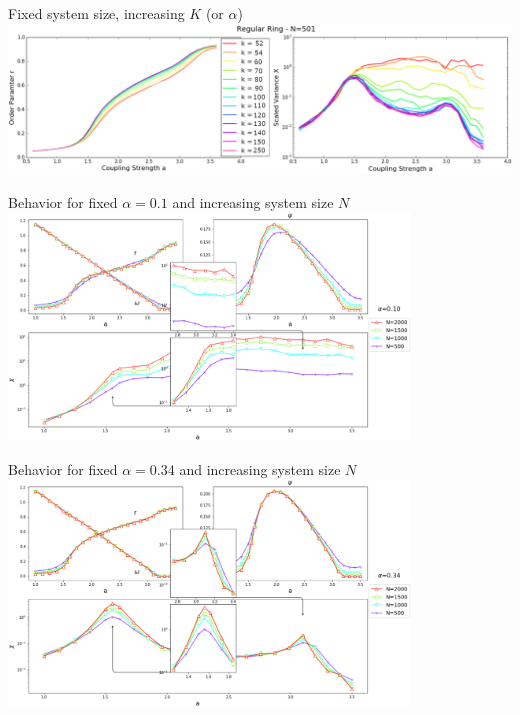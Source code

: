 \documentclass[serif,mathserif]{beamer}
\begin{document}
\begin{frame}
    \centering
    Fixed system size, increasing $K$ (or $\alpha$)\\
    \vspace{0.25cm}
    \includegraphics[width=\textwidth]{ringOP.eps}
\end{frame}

\begin{frame}
    \centering
    Behavior for fixed $\alpha=0.1$ and increasing system size $N$\\
    \vspace{0.25cm}
    \includegraphics[width=0.8\textwidth]{increasingN-alpha10.eps}
\end{frame}

\begin{frame}
    \centering
    Behavior for fixed $\alpha=0.34$ and increasing system size $N$\\
    \vspace{0.25cm}
    \includegraphics[width=0.8\textwidth]{increasingN-alpha34.eps}
\end{frame}
\end{document}
